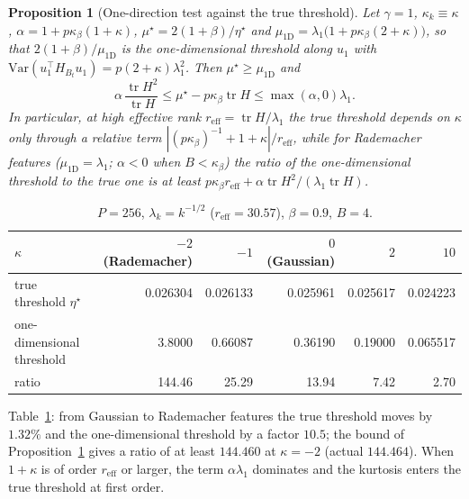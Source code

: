 \documentclass[11pt]{article}
\newtheorem{proposition}[theorem]{Proposition}
\theoremstyle{remark}
\newcommand{\tr}{\operatorname{tr}}
\begin{document}
\begin{proposition}[One-direction test against the true threshold]\label{prop:1d}
Let $\gamma=1$, $\kappa_k\equiv\kappa$, $\alpha=1+p\kappa_\beta(1+\kappa)$, $\mu^\star=2(1+\beta)/\eta^\star$ and $\mu_{\mathrm{1D}}=\lambda_1\big(1+p\kappa_\beta(2+\kappa)\big)$, so that $2(1+\beta)/\mu_{\mathrm{1D}}$ is the one-dimensional threshold along $u_1$ \citep[eq.~(10)]{andreyev2026momentum} with $\mathrm{Var}(u_1^\top H_{B_t}u_1)=p(2+\kappa)\lambda_1^2$. Then $\mu^\star\ge\mu_{\mathrm{1D}}$ and
\[
\alpha\,\frac{\tr H^2}{\tr H}\le\mu^\star-p\kappa_\beta\tr H\le\max(\alpha,0)\lambda_1 .
\]
In particular, at high effective rank $r_{\mathrm{eff}}=\tr H/\lambda_1$ the true threshold depends on $\kappa$ only through a relative term $|(p\kappa_\beta)^{-1}+1+\kappa|/r_{\mathrm{eff}}$, while for Rademacher features ($\mu_{\mathrm{1D}}=\lambda_1$; $\alpha<0$ when $B<\kappa_\beta$) the ratio of the one-dimensional threshold to the true one is at least $p\kappa_\beta r_{\mathrm{eff}}+\alpha\tr H^2/(\lambda_1\tr H)$.
\end{proposition}

\begin{table}[!ht]
\centering
\caption{$P=256$, $\lambda_k=k^{-1/2}$ ($r_{\mathrm{eff}}=30.57$), $\beta=0.9$, $B=4$.}
\label{tab:1d}
\smallskip
{\small\begin{tabular}{lrrrrr}
\toprule
$\kappa$ & $-2$ (Rademacher) & $-1$ & $0$ (Gaussian) & $2$ & $10$\\
\midrule
true threshold $\eta^\star$ & 0.026304 & 0.026133 & 0.025961 & 0.025617 & 0.024223\\
one-dimensional threshold & 3.8000 & 0.66087 & 0.36190 & 0.19000 & 0.065517\\
ratio & 144.46 & 25.29 & 13.94 & 7.42 & 2.70\\
\bottomrule
\end{tabular}}
\end{table}

Table~\ref{tab:1d}: from Gaussian to Rademacher features the true threshold moves by $1.32\%$ and the one-dimensional threshold by a factor $10.5$; the bound of Proposition~\ref{prop:1d} gives a ratio of at least $144.460$ at $\kappa=-2$ (actual $144.464$). When $1+\kappa$ is of order $r_{\mathrm{eff}}$ or larger, the term $\alpha\lambda_1$ dominates and the kurtosis enters the true threshold at first order.
\end{document}
